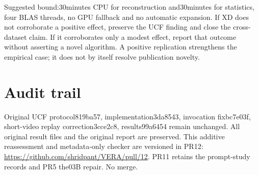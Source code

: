 \documentclass[10pt]{article}
\begin{document}
Suggested bound:30minutes CPU for reconstruction and30minutes for statistics, four BLAS threads, no GPU fallback and no automatic expansion. If XD does not corroborate a positive effect, preserve the UCF finding and close the cross-dataset claim. If it corroborates only a modest effect, report that outcome without asserting a novel algorithm. A positive replication strengthens the empirical case; it does not by itself resolve publication novelty.

\section{Audit trail}
Original UCF protocol819ba57, implementation3da8543, invocation fixbc7e03f, short-video replay correction3cce2c8, results99a6454 remain unchanged. All original result files and the original report are preserved. This additive reassessment and metadata-only checker are versioned in PR12: \url{https://github.com/shridpant/VERA/pull/12}. PR11 retains the prompt-study records and PR5 the03B repair. No merge.
\end{document}
